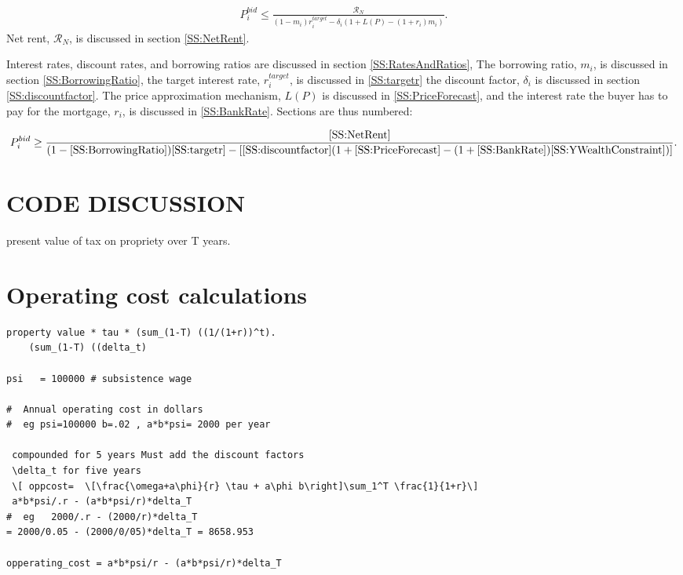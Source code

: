 \begin{align}
P_i^{bid} \le   \frac{\mathcal{R}_N}{(1-m_i)r_i^{target}- \delta_i \left(1+L(P)- (1+ r_i)m_i\right)}.
\end{align}
Net rent, $\mathcal{R}_N$, is discussed in section \ref{SS:NetRent}. 

Interest rates, discount rates, and borrowing ratios are discussed in section \ref{SS:RatesAndRatios},
The borrowing ratio, $m_i$, is discussed in section \ref{SS:BorrowingRatio}, the target interest rate, $r_i^{target}$, is discussed in \ref{SS:targetr} the discount factor, $\delta_i$ is discussed in section \ref{SS:discountfactor}. The price approximation mechanism, $L(P)$ is discussed in \ref{SS:PriceForecast}, and the interest rate the buyer has to pay for the mortgage, $r_i$, is discussed in \ref{SS:BankRate}. Sections are thus numbered: 

\begin{align*}
P_i^{bid} \ge   \frac{\ref{SS:NetRent}} {(1-\ref{SS:BorrowingRatio})\ref{SS:targetr}-
\left[ \ref{SS:discountfactor}(1+\ref{SS:PriceForecast}- (1+\ref{SS:BankRate})\ref{SS:YWealthConstraint})\right]}. 
\end{align*}


\section{CODE DISCUSSION}

present value of tax on propriety over T years. 

\section{Operating cost calculations}
\begin{verbatim}
property value * tau * (sum_(1-T) ((1/(1+r))^t).    
    (sum_(1-T) ((delta_t)

psi   = 100000 # subsistence wage
    
#  Annual operating cost in dollars  
#  eg psi=100000 b=.02 , a*b*psi= 2000 per year 

 compounded for 5 years Must add the discount factors  
 \delta_t for five years 
 \[ oppcost=  \[\frac{\omega+a\phi}{r} \tau + a\phi b\right]\sum_1^T \frac{1}{1+r}\]
 a*b*psi/.r - (a*b*psi/r)*delta_T
#  eg   2000/.r - (2000/r)*delta_T 
= 2000/0.05 - (2000/0/05)*delta_T = 8658.953

opperating_cost = a*b*psi/r - (a*b*psi/r)*delta_T 
\end{verbatim}


